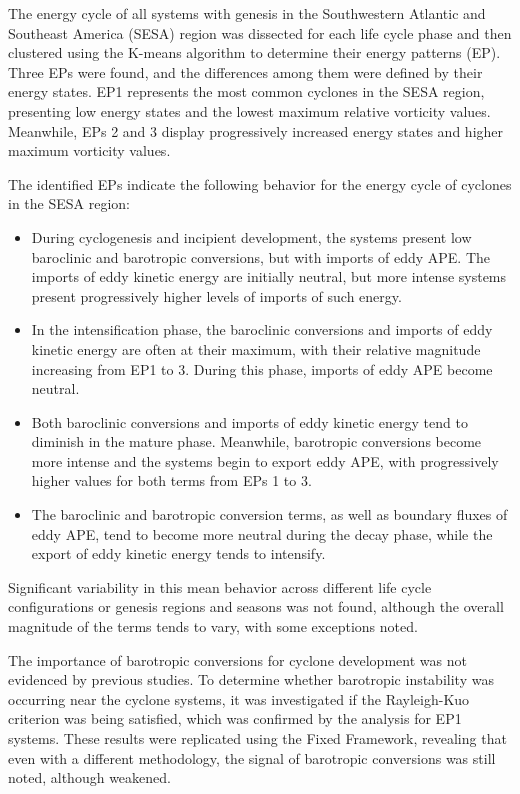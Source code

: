 The energy cycle of all systems with genesis in the Southwestern Atlantic and Southeast America (SESA) region was dissected for each life cycle phase and then clustered using the K-means algorithm to determine their energy patterns (EP). Three EPs were found, and the differences among them were defined by their energy states. EP1 represents the most common cyclones in the SESA region, presenting low energy states and the lowest maximum relative vorticity values. Meanwhile, EPs 2 and 3 display progressively increased energy states and higher maximum vorticity values.

The identified EPs indicate the following behavior for the energy cycle of cyclones in the SESA region:

\begin{itemize}
    \item During cyclogenesis and incipient development, the systems present low baroclinic and barotropic conversions, but with imports of eddy APE. The imports of eddy kinetic energy are initially neutral, but more intense systems present progressively higher levels of imports of such energy.
    \item In the intensification phase, the baroclinic conversions and imports of eddy kinetic energy are often at their maximum, with their relative magnitude increasing from EP1 to 3. During this phase, imports of eddy APE become neutral.
    \item Both baroclinic conversions and imports of eddy kinetic energy tend to diminish in the mature phase. Meanwhile, barotropic conversions become more intense and the systems begin to export eddy APE, with progressively higher values for both terms from EPs 1 to 3.
    \item The baroclinic and barotropic conversion terms, as well as boundary fluxes of eddy APE, tend to become more neutral during the decay phase, while the export of eddy kinetic energy tends to intensify.
\end{itemize}

Significant variability in this mean behavior across different life cycle configurations or genesis regions and seasons was not found, although the overall magnitude of the terms tends to vary, with some exceptions noted.

The importance of barotropic conversions for cyclone development was not evidenced by previous studies. To determine whether barotropic instability was occurring near the cyclone systems, it was investigated if the Rayleigh-Kuo criterion was being satisfied, which was confirmed by the analysis for EP1 systems. These results were replicated using the Fixed Framework, revealing that even with a different methodology, the signal of barotropic conversions was still noted, although weakened.

